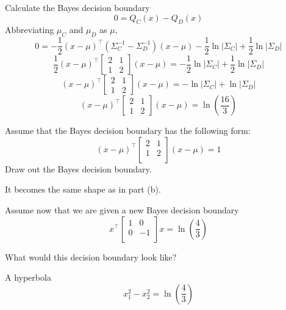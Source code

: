 \begin{Parts}
\begin{solution}
Calculate the Bayes decision boundary
\[0 = Q_C(x) - Q_D(x)\]
Abbreviating $\mu_C$ and $\mu_D$ as $\mu$,
\[0 = -\frac{1}{2}(x - \mu)^{\top}(\Sigma_C^{-1} - \Sigma_D^{-1})(x - \mu) - \frac{1}{2}\ln|\Sigma_C| + \frac{1}{2}\ln|\Sigma_D|\]
\[
\frac{1}{2}(x - \mu)^{\top}\begin{bmatrix}
2 & 1\\
1 & 2
\end{bmatrix}(x - \mu) =  -\frac{1}{2}\ln|\Sigma_C| + \frac{1}{2}\ln|\Sigma_D|
\]
\[
(x - \mu)^{\top}\begin{bmatrix}
2 & 1\\
1 & 2
\end{bmatrix}(x - \mu) =  -\ln|\Sigma_C| + \ln|\Sigma_D|
\]
\[
(x - \mu)^{\top}\begin{bmatrix}
2 & 1\\
1 & 2
\end{bmatrix}(x - \mu) =  \ln(\frac{16}{3})
\]
\end{solution}

\Part

Assume that the Bayes decision boundary has the following form:
\[
(x - \mu)^\top\begin{bmatrix}
2 & 1\\
1 & 2\\
\end{bmatrix}(x - \mu) = 1
\]
Draw out the Bayes decision boundary.

\begin{solution}

It becomes the same shape as in part (b).

\end{solution}


\Part

Assume now that we are given a new Bayes decision boundary
\[
x^\top\begin{bmatrix}
1 & 0\\
0 & -1\\
\end{bmatrix}x = \ln(\frac{4}{3})
\]

What would this decision boundary look like?

\begin{solution}
A hyperbola
\[
x_1^2 - x_2^2 = \ln(\frac{4}{3})
\]
\end{solution}
\end{Parts}

\newpage
